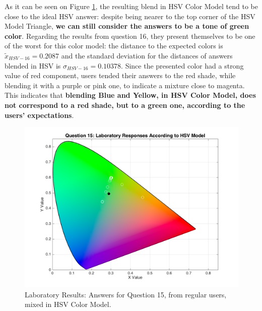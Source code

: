 \begin{enumerate}
  As it can be seen on Figure \ref{fig:labhsvregular_15}, the resulting blend in HSV Color Model tend to be close to the ideal HSV answer: despite being nearer to the top corner of the HSV Model Triangle, \textbf{we can still
  consider the answers to be a tone of green color}. Regarding the results from question 16, they present themselves to be one of the worst for this color model: the distance to the expected colors is $\tilde{x}_{HSV-16} = 0.2087$
  and the standard deviation for the distances of answers blended in HSV is $\sigma_{HSV-16} = 0.10378$. Since the presented color had a strong value of red component, users tended their answers to the red shade, while blending
  it with a purple or pink one, to indicate a mixture close to magenta. This indicates that \textbf{blending Blue and Yellow, in HSV Color Model, does not correspond to a red shade, but to a green one, according to
  the users' expectations}.
  \begin{figure}[!htbp]
    \centering
    \begin{minipage}{0.48\textwidth}
      \centering
      \includegraphics[width=\textwidth]{images/results/15_lab_HSVresponses.png}
      \caption[Laboratory Results: Answers for Question 15, from regular users, mixed in HSV Color Model.]{Laboratory Results: Answers for Question 15, from regular users, mixed in HSV Color Model.}
      \label{fig:labhsvregular_15}
    \end{minipage}\hfill
    \begin{minipage}{0.48\textwidth}
      \centering

\end{minipage}
\end{figure}
\end{enumerate}
